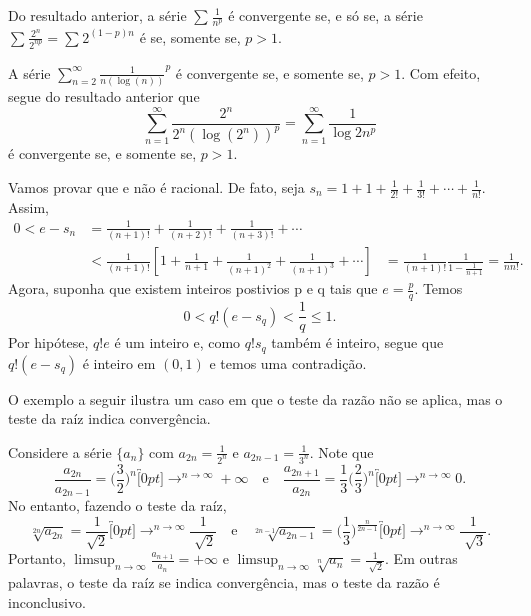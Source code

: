 \documentclass[Analysis/analysis_notes.tex]{subfiles}
\begin{document}
\begin{example}
	Do resultado anterior, a s\'erie $\sum\limits_{}^{}\frac{1}{n^{p}}$ \'e convergente se, e s\'o se, a s\'erie $\sum\limits_{}^{}\frac{2^{n}}{2^{np}} = \sum\limits_{}^{}2^{(1-p)n}$ \'e
	se, somente se, $p>1.$
\end{example}
\begin{example}
	A s\'erie $\sum\limits_{n=2}^{\infty}\frac{1}{n(\log{(n)})}^{p}$ \'e convergente se, e somente se, $p>1.$ Com efeito, segue do resultado anterior que
	$$
		\sum\limits_{n=1}^{\infty}\frac{2^{n}}{2^{n}(\log{(2^{n})})^{p}} = \sum\limits_{n=1}^{\infty}\frac{1}{\log{2}n^{p}}
	$$
	\'e convergente se, e somente se, $p>1$.
\end{example}
\begin{example}
	Vamos provar que e n\~ao \'e racional. De fato, seja $s_{n} = 1 + 1 + \frac{1}{2!} + \frac{1}{3!} + \cdots + \frac{1}{n!}.$ Assim,
	\begin{align*}
		0 < e - s_{n} & = \frac{1}{(n+1)!}+\frac{1}{(n+2)!} + \frac{1}{(n+3)!} + \cdots                     \\
		              & < \frac{1}{(n+1)!}[1+\frac{1}{n+1}+\frac{1}{(n+1)^{2}}+ \frac{1}{(n+1)^{3}}+\cdots]
		              & = \frac{1}{(n+1)!}\frac{1}{1-\frac{1}{n+1}} = \frac{1}{nn!}.
	\end{align*}
	Agora, suponha que existem inteiros postivios p e q tais que $e = \frac{p}{q}$. Temos
	$$
		0 < q!(e-s_{q})<\frac{1}{q}\leq{1}.
	$$
	Por hip\'otese, $q!e$ \'e um inteiro e, como $q!s_{q}$ tamb\'em \'e inteiro, segue que $q!(e-s_{q})$ \'e inteiro em $(0,1)$ e temos
	uma contradi\c c\~ao.
\end{example}
O exemplo a seguir ilustra um caso em que o teste da raz\~ao n\~ao se aplica, mas o teste da ra\'iz indica converg\^encia.
\begin{example}
	Considere a s\'erie $\{a_{n}\}$ com $a_{2n} = \frac{1}{2^{n}}$ e $a_{2n-1}= \frac{1}{3^{n}}.$ Note que
	$$
		\frac{a_{2n}}{a_{2n-1}} = \biggl(\frac{3}{2}\biggr)^{n}\overbracket[0pt]{\longrightarrow}^{n\to \infty}+\infty\quad\text{e}\quad \frac{a_{2n+1}}{a_{2n}} = \frac{1}{3}\biggl(\frac{2}{3}\biggr)^{n}\overbracket[0pt]{\longrightarrow}^{n\to \infty}0.
	$$
	No entanto, fazendo o teste da ra\'iz,
	$$
		\sqrt[2n]{a_{2n}} = \frac{1}{\sqrt{2}}\overbracket[0pt]{\longrightarrow}^{n\to \infty}\frac{1}{\sqrt[]{2}}\quad\text{e}\quad \sqrt[2n-1]{a_{2n-1}}=\biggl(\frac{1}{3}\biggr)^{\frac{n}{2n-1}}\overbracket[0pt]{\longrightarrow}^{n\to \infty}\frac{1}{\sqrt[]{3}}.
	$$
	Portanto, $\limsup_{n\to\infty}\frac{a_{n+1}}{a_{n}} = +\infty$ e $\limsup_{n\to\infty}\sqrt[n]{a_{n}} = \frac{1}{\sqrt[]{2}}$. Em outras palavras,
	o teste da ra\'iz se indica converg\^encia, mas o teste da raz\~ao \'e inconclusivo. \qedsymbol
\end{example}
\end{document}
